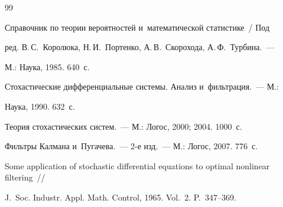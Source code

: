 {{\begin{thebibliography}{99}

Справочник по теории вероятностей и~математической статистике~/ Под

ред. В.\,С.~Королюка, Н.\,И.~Портенко, А.\,В.~Скорохода, А.\,Ф.~Турбина.~--- 

М.: Наука, 1985. 640~с.





Стохастические дифференциальные системы. Анализ и~фильтрация.~--- М.:

Наука,  1990.  632~с. 






\pagebreak







Теория стохастических систем.~--- М.: Логос, 2000; 2004. 1000~с.

















Фильтры Калмана и~Пугачева.~--- 2-е изд.~--- М.: Логос, 2007. 776~с.





Some application of stochastic differential equations to optimal nonlinear filtering~/\!\!/ 

J.~Soc. Industr. Appl. Math. Control, 1965. Vol.~2. P.~347--369.






\end{thebibliography}}}

